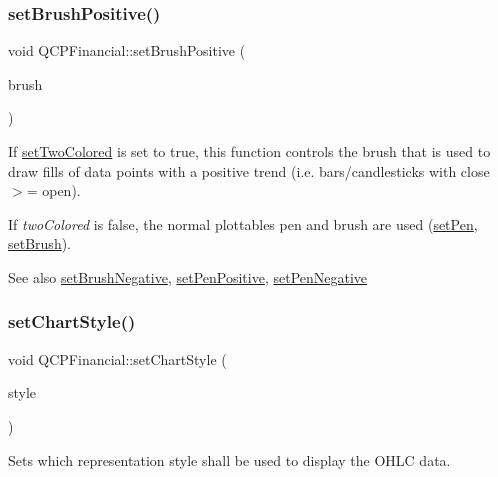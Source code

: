 \subsubsection{\texorpdfstring{set\+Brush\+Positive()}{setBrushPositive()}}
{\footnotesize\ttfamily void Q\+C\+P\+Financial\+::set\+Brush\+Positive (\begin{DoxyParamCaption}\item[{const Q\+Brush \&}]{brush }\end{DoxyParamCaption})}

If \hyperlink{class_q_c_p_financial_a138e44aac160a17a9676652e240c5f08}{set\+Two\+Colored} is set to true, this function controls the brush that is used to draw fills of data points with a positive trend (i.\+e. bars/candlesticks with close $>$= open).

If {\itshape two\+Colored} is false, the normal plottable\textquotesingle{}s pen and brush are used (\hyperlink{class_q_c_p_abstract_plottable_ab74b09ae4c0e7e13142fe4b5bf46cac7}{set\+Pen}, \hyperlink{class_q_c_p_abstract_plottable_a7a4b92144dca6453a1f0f210e27edc74}{set\+Brush}).

\begin{DoxySeeAlso}{See also}
\hyperlink{class_q_c_p_financial_a8bbdd87629f9144b3ef51af660c0961a}{set\+Brush\+Negative}, \hyperlink{class_q_c_p_financial_ac58aa3adc7a35aab0088764b840683e5}{set\+Pen\+Positive}, \hyperlink{class_q_c_p_financial_afe5c07e94ccea01a75b3a2476993c346}{set\+Pen\+Negative} 
\end{DoxySeeAlso}
\hypertarget{class_q_c_p_financial_a5a59175d36279d71596e64d7bb65596f}{}\label{class_q_c_p_financial_a5a59175d36279d71596e64d7bb65596f} 
\subsubsection{\texorpdfstring{set\+Chart\+Style()}{setChartStyle()}}
{\footnotesize\ttfamily void Q\+C\+P\+Financial\+::set\+Chart\+Style (\begin{DoxyParamCaption}\item[{\hyperlink{class_q_c_p_financial_a0f800e21ee98d646dfc6f8f89d10ebfb}{Q\+C\+P\+Financial\+::\+Chart\+Style}}]{style }\end{DoxyParamCaption})}

Sets which representation style shall be used to display the O\+H\+LC data. \hypertarget{class_q_c_p_financial_adf12a86082f1e488df6a4e8603f8fd6d}{}\label{class_q_c_p_financial_adf12a86082f1e488df6a4e8603f8fd6d} 
